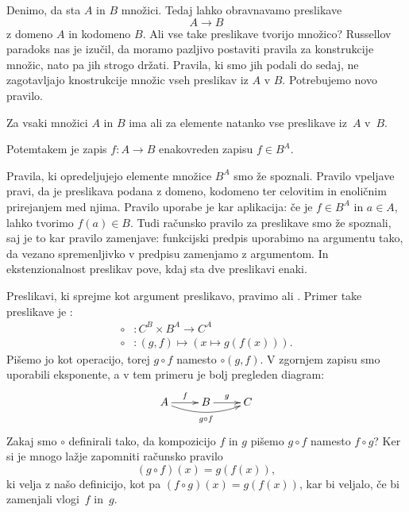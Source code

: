 Denimo, da sta $A$ in $B$ množici. Tedaj lahko obravnavamo preslikave
%
\begin{equation*}
  A \to B
\end{equation*}
%
z domeno $A$ in kodomeno $B$. Ali vse take preslikave tvorijo množico? Russellov paradoks
nas je izučil, da moramo pazljivo postaviti pravila za konstrukcije množic, nato pa jih
strogo držati. Pravila, ki smo jih podali do sedaj, ne zagotavljajo knostrukcije množic
vseh preslikav iz $A$ v $B$. Potrebujemo novo pravilo.

\begin{pravilo}[Eksponent]
  Za vsaki množici $A$ in $B$ ima  ali  za
  elemente natanko vse preslikave iz~$A$ v~$B$.
\end{pravilo}

Potemtakem je zapis $f : A \to B$ enakovreden zapisu $f \in B^A$.

Pravila, ki opredeljujejo elemente množice $B^A$ smo že spoznali. Pravilo vpeljave pravi,
da je preslikava podana z domeno, kodomeno ter celovitim in enoličnim prirejanjem med
njima. Pravilo uporabe je kar aplikacija: če je $f \in B^A$ in $a \in A$, lahko tvorimo
$f(a) \in B$. Tudi računsko pravilo za preslikave smo že spoznali, saj je to kar pravilo
zamenjave: funkcijski predpis uporabimo na argumentu tako, da vezano spremenljivko v
predpisu zamenjamo z argumentom. In ekstenzionalnost preslikav pove, kdaj sta dve
preslikavi enaki.

Preslikavi, ki sprejme kot argument preslikavo, pravimo  ali . Primer take preslikave je :
%
\begin{align*}
  {\circ} &: C^B \times B^A \to C^A \\
  {\circ} &: (g, f) \mapsto (x \mapsto g(f(x))).
\end{align*}
%
Pišemo jo kot operacijo, torej $g \circ f$ namesto ${\circ}(g, f)$. V zgornjem zapisu smo
uporabili eksponente, a v tem primeru je bolj pregleden diagram:
%
\begin{equation*}
  \xymatrix{
    {A}
    \ar[r]^{f}
    \ar@/_2ex/[rr]_{g \circ f}
    &
    {B}
    \ar[r]^{g}
    &
    {C}
  }
\end{equation*}
%
Zakaj smo $\circ$ definirali tako, da kompozicijo $f$ in $g$ pišemo $g \circ f$ namesto
$f \circ g$? Ker si je mnogo lažje zapomniti računsko pravilo
%
\begin{equation*}
  (g \circ f)(x) = g(f(x)),
\end{equation*}
%
ki velja z našo definicijo, kot pa $(f \circ g)(x) = g(f(x))$, kar bi veljalo, če bi
zamenjali vlogi~$f$ in~$g$.

